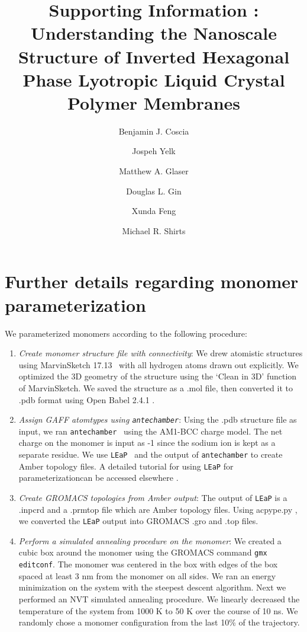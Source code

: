 \documentclass{article}
\title{Supporting Information : Understanding the Nanoscale Structure of Inverted Hexagonal Phase Lyotropic Liquid Crystal Polymer Membranes}
\author{Benjamin J. Coscia \and Jospeh Yelk \and Matthew A. Glaser \and Douglas L. Gin \and Xunda Feng \and Michael R. Shirts}
\date{}
\begin{document}
  
  \graphicspath{{./figures/}}  %
  \maketitle

  \section{Further details regarding monomer parameterization}\label{section:parameterization}
 
  We parameterized monomers according to the following procedure:
  \begin{enumerate}
  
	\item \textit{Create monomer structure file with connectivity}: We
	drew atomistic structures using MarvinSketch
	17.13~\cite{chemaxon_marvinsketch_2017} with all hydrogen atoms drawn out
	explicitly. We optimized the 3D geometry of the structure using the `Clean in
	3D' function of MarvinSketch.  We saved the structure as a .mol file, then
	converted it to .pdb format using Open Babel 2.4.1
	\cite{oboyle_open_2011,noauthor_open_nodate}. 
	
	\item \textit{Assign GAFF atomtypes using \texttt{antechamber}}: Using
	the .pdb structure file as input, we ran
	\texttt{antechamber}~\cite{wang_automatic_2006} using the AM1-BCC charge model.
	The net charge on the monomer is input as -1 since the sodium ion is kept as 
	a separate residue. We use \texttt{LEaP}~\cite{case_ambertools16_2016} and the
	output of \texttt{antechamber} to create Amber topology files. A detailed
	tutorial for using \texttt{LEaP} for parameterizationcan be accessed elsewhere \cite{walker_antechamber_nodate}.

	\item \textit{Create GROMACS topologies from Amber output}: The output
	of \texttt{LEaP} is a .inpcrd and a .prmtop file which are Amber topology
	files. Using acpype.py \cite{sousa_da_silva_acpype_2012}, we converted the
	\texttt{LEaP} output into GROMACS .gro and .top files. 

	\item \textit{Perform a simulated annealing procedure on the monomer}:
	We created a cubic box around the monomer using the GROMACS command \texttt{gmx
	editconf}. The monomer was centered in the box with edges of the
	box spaced at least 3 nm from the monomer on all sides. We ran an energy minimization
	on the system with the steepest descent algorithm. Next we performed an NVT
	simulated annealing procedure. We linearly decreased the temperature of the
	system from 1000 K to 50 K over the course of 10 ns. We randomly chose a monomer
	configuration from the last 10\% of the trajectory. 


\end{enumerate}
\end{document}
